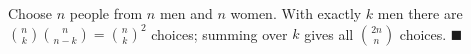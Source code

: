 Choose $n$ people from $n$ men and $n$ women. With exactly $k$ men there are $\binom nk\binom n{n-k}=\binom nk^2$ choices; summing over $k$ gives all $\binom{2n}n$ choices. $\blacksquare$
